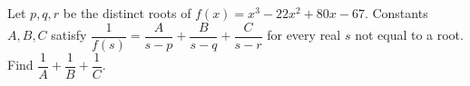 Let $p,q,r$ be the distinct roots of $f(x)=x^3-22x^2+80x-67$. Constants $A,B,C$ satisfy $\dfrac{1}{f(s)}=\dfrac{A}{s-p}+\dfrac{B}{s-q}+\dfrac{C}{s-r}$ for every real $s$ not equal to a root. Find $\dfrac{1}{A}+\dfrac{1}{B}+\dfrac{1}{C}$.
